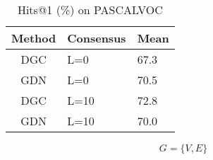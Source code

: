 \begin{table}[ht]
    \centering
   \begin{tabular}{|c|C{2cm}|C{2cm}|}
        \hline
        \textbf{Method}&\textbf{Consensus} &\textbf{Mean} \\
        \hline
        DGC & L=0 &67.3\\
        \hline
        GDN & L=0&70.5\\
        \hline
        DGC & L=10&72.8\\
        \hline
        GDN & L=10&70.0\\
        \hline
    \end{tabular}
    \caption{Hits@1 (\%) on PASCALVOC}
    \label{tab:ex2}
\end{table}

\begin{equation}
G = \{V, E\}
\end{equation}
